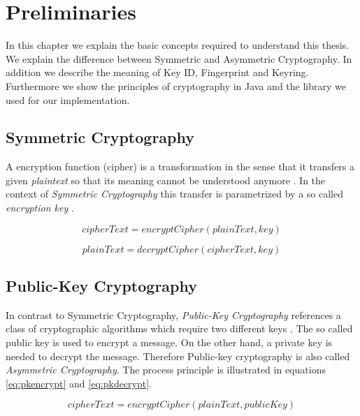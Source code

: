 \chapter{Preliminaries}
\label{chapter:pre}

In this chapter we explain the basic concepts required to understand this thesis. We explain the difference between Symmetric and Asymmetric Cryptography. In addition we describe the meaning of Key ID, Fingerprint and Keyring. Furthermore we show the principles of cryptography in Java and the library we used for our implementation.

\section{Symmetric Cryptography} \label{section:pre:symcrypto}


A encryption function (cipher) is a transformation in the sense that it transfers a given \textit{plaintext} so that its meaning cannot be understood anymore \citep[section 1.4]{HAC}. In the context of \textit{Symmetric Cryptography} this transfer is parametrized by a so called \textit{encryption key}  \citep[section 1.5]{HAC}.

\begin{equation} \label{eq:skencrypt}
	cipherText = encryptCipher(plainText, key)
\end{equation}

\begin{equation} \label{eq:skdecrypt}
	plainText = decryptCipher(cipherText, key)
\end{equation}


\section{Public-Key Cryptography}
\label{section:pre:publiccrypto}

In contrast to  {Symmetric Cryptography}, \textit{Public-Key Cryptography} references a class of cryptographic algorithms which require two different keys \citep[section 1.8]{HAC}. The so called public key is used to encrypt a message. On the other hand, a private key is needed to decrypt the message. Therefore Public-key cryptography is also called \textit{Asymmetric Cryptography}.  The process principle is illustrated in equations \ref{eq:pkencrypt} and \ref{eq:pkdecrypt}. 

\begin{equation} \label{eq:pkencrypt}
	cipherText = encryptCipher(plainText, publicKey)
\end{equation}


